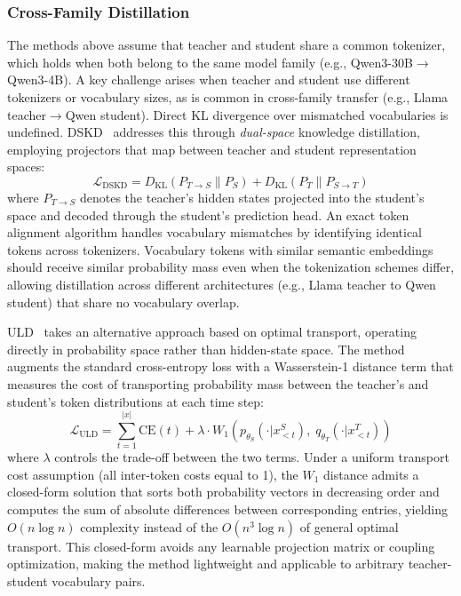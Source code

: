 \documentclass{article} %
\newcommand{\KL}{D_{\mathrm{KL}}}
\begin{document}
\subsubsection{Cross-Family Distillation}
\label{subsubsec:cross_family}

The methods above assume that teacher and student share a common tokenizer, which holds when both belong to the same model family (e.g., Qwen3-30B$\to$Qwen3-4B). A key challenge arises when teacher and student use different tokenizers or vocabulary sizes, as is common in cross-family transfer (e.g., Llama teacher$\to$Qwen student). Direct KL divergence over mismatched vocabularies is undefined. DSKD~\citep{2504.11426} addresses this through \emph{dual-space} knowledge distillation, employing projectors that map between teacher and student representation spaces:
\begin{equation}
    \mathcal{L}_{\text{DSKD}} = \KL(P_{T \to S} \parallel P_S) + \KL(P_T \parallel P_{S \to T})
\end{equation}
where $P_{T \to S}$ denotes the teacher's hidden states projected into the student's space and decoded through the student's prediction head. An exact token alignment algorithm handles vocabulary mismatches by identifying identical tokens across tokenizers. Vocabulary tokens with similar semantic embeddings should receive similar probability mass even when the tokenization schemes differ, allowing distillation across different architectures (e.g., Llama teacher to Qwen student) that share no vocabulary overlap.

ULD~\citep{2402.12030} takes an alternative approach based on optimal transport, operating directly in probability space rather than hidden-state space. The method augments the standard cross-entropy loss with a Wasserstein-1 distance term that measures the cost of transporting probability mass between the teacher's and student's token distributions at each time step:
\begin{equation}
    \mathcal{L}_{\text{ULD}} = \sum_{t=1}^{|x|} \mathrm{CE}(t) + \lambda \cdot W_1\!\left(p_{\theta_S}(\cdot|x_{<t}^S),\; q_{\theta_T}(\cdot|x_{<t}^T)\right)
\end{equation}
where $\lambda$ controls the trade-off between the two terms. Under a uniform transport cost assumption (all inter-token costs equal to 1), the $W_1$ distance admits a closed-form solution that sorts both probability vectors in decreasing order and computes the sum of absolute differences between corresponding entries, yielding $O(n \log n)$ complexity instead of the $O(n^3 \log n)$ of general optimal transport. This closed-form avoids any learnable projection matrix or coupling optimization, making the method lightweight and applicable to arbitrary teacher-student vocabulary pairs.
\end{document}
